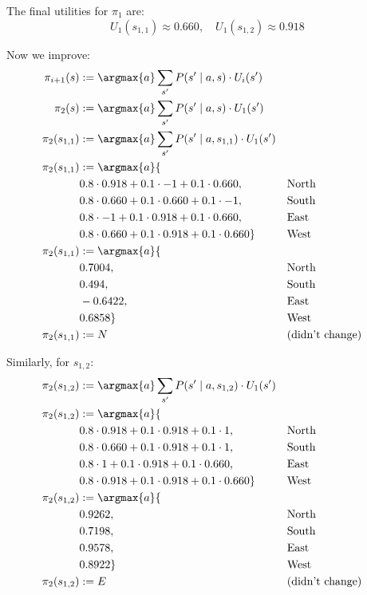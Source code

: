 The final utilities for $\pi_1$ are:
\begin{equation*}
    U_1(s_{1,1}) \approx 0.660, \quad U_1(s_{1,2}) \approx 0.918
\end{equation*}

Now we improve:
\begin{align*}
\pi_{i+1}(s) &:= \argmax{a} \sum_{s'} P(s' \mid a,s) \cdot U_i(s') \\
\pi_{2}(s) &:= \argmax{a} \sum_{s'} P(s' \mid a,s) \cdot U_1(s') \\
\pi_{2}(s_{1,1}) &:= \argmax{a} \sum_{s'} P(s' \mid a,s_{1,1}) \cdot U_1(s') \\
\pi_{2}(s_{1,1}) &:= \argmax{a} \{ \\
&0.8 \cdot 0.918 + 0.1 \cdot -1 + 0.1 \cdot 0.660 , && \text{North} \\
&0.8 \cdot 0.660 + 0.1 \cdot 0.660 + 0.1 \cdot -1 ,  && \text{South} \\
&0.8 \cdot -1 + 0.1 \cdot 0.918 + 0.1 \cdot 0.660 ,  && \text{East} \\
&0.8 \cdot 0.660 + 0.1 \cdot 0.918 + 0.1 \cdot 0.660 \} && \text{West} \\
\pi_{2}(s_{1,1}) &:= \argmax{a} \{ \\
&0.7004 , && \text{North} \\
&0.494 ,  && \text{South} \\
&-0.6422 ,  && \text{East} \\
&0.6858 \} && \text{West} \\
\pi_{2}(s_{1,1}) &:= N && (\text{didn't change})
\end{align*}

Similarly, for $s_{1,2}$:
\begin{align*}
\pi_{2}(s_{1,2}) &:= \argmax{a} \sum_{s'} P(s' \mid a,s_{1,2}) \cdot U_1(s') \\
\pi_{2}(s_{1,2}) &:= \argmax{a} \{ \\
&0.8 \cdot 0.918 + 0.1 \cdot 0.918 + 0.1 \cdot 1 , && \text{North} \\
&0.8 \cdot 0.660 + 0.1 \cdot 0.918 + 0.1 \cdot 1 ,  && \text{South} \\
&0.8 \cdot 1 + 0.1 \cdot 0.918 + 0.1 \cdot 0.660 ,  && \text{East} \\
&0.8 \cdot 0.918 + 0.1 \cdot 0.918 + 0.1 \cdot 0.660 \} && \text{West} \\
\pi_{2}(s_{1,2}) &:= \argmax{a} \{ \\
&0.9262 , && \text{North} \\
&0.7198 ,  && \text{South} \\
&0.9578 ,  && \text{East} \\
&0.8922 \} && \text{West} \\
\pi_{2}(s_{1,2}) &:= E && (\text{didn't change})
\end{align*}


